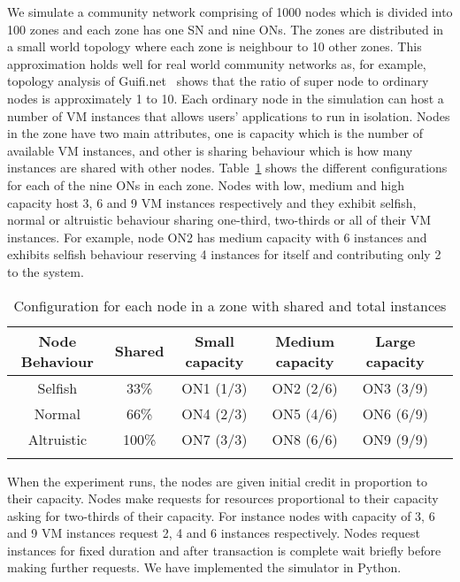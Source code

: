 We simulate a community network comprising of 1000 nodes which is divided into 100 zones and each zone has one SN and nine ONs.
The zones are distributed in a small world topology where each zone is neighbour to 10 other zones.
This approximation holds well for real world community networks as, for example, topology analysis of Guifi.net~\cite{Vega2012} shows that the ratio of super node to ordinary nodes is approximately 1 to 10. 
Each ordinary node in the simulation can host a number of VM instances that allows users' applications to run in isolation.
Nodes in the zone have two main attributes, one is capacity which is the number of available VM instances, and other is sharing behaviour which is how many instances are shared with other nodes.
Table~\ref{tab:ONconf} shows the different configurations for each of the nine ONs in each zone.
Nodes with low, medium and high capacity host 3, 6 and 9 VM instances respectively and they exhibit selfish, normal or altruistic behaviour sharing one-third, two-thirds or all of their VM instances.
For example, node ON2 has medium capacity with 6 instances and exhibits selfish behaviour reserving 4 instances for itself and contributing only 2 to the system.

\begin{table}[tbp]
\renewcommand{\arraystretch}{1.3}
\footnotesize
\centering
     \caption{Configuration for each node in a zone with shared and total instances}
    \begin{tabular}{@{} cc c c c c @{}}
    \hline
    {Node Behaviour} & {Shared} & Small capacity & Medium capacity & Large capacity   \\  \hline
    {Selfish} & 33\% 	& ON1 (1/3) & ON2 (2/6) & ON3 (3/9) & \\ 
	{Normal} & 66\% 	& ON4 (2/3) & ON5 (4/6) & ON6 (6/9) & \\ 
	{Altruistic} & 100\%& ON7 (3/3) & ON8 (6/6) & ON9 (9/9) & \\ \hline
    \label{tab:ONconf}
    \end{tabular}
\end{table}

When the experiment runs, the nodes are given initial credit in proportion to their capacity.
Nodes make requests for resources proportional to their capacity asking for two-thirds of their capacity.
For instance nodes with capacity of 3, 6 and 9 VM instances request 2, 4 and 6 instances respectively.
Nodes request instances for fixed duration and after transaction is complete wait briefly before making further requests.
We have implemented the simulator in Python.

